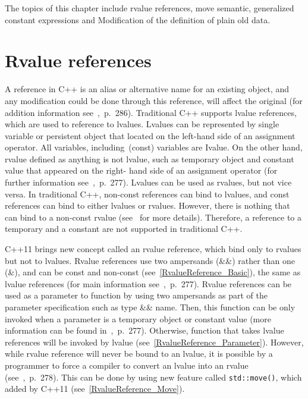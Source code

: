 \documentclass[11pt]{report}
\begin{document}
The topics of this chapter include rvalue references, move semantic, generalized constant expressions and Modification of the definition of plain old data.


\section{Rvalue references}
\label{section: Rvalue references}
A reference in C++ is an alias or alternative name for an existing object, and any modification could be done through this reference, will affect the original (for addition information see~\cite{Gregorie:professionalcpp},~p.~286). Traditional C++ supports lvalue references, which are used to reference to lvalues. Lvalues can be represented by single variable or persistent object that located on the left-hand side of an assignment operator. All variables, including~(const) variables are Ivalue. On the other hand, rvalue defined as anything is not lvalue, such as temporary object and constant value that appeared on the right- hand side of an assignment operator (for further information see~\cite{Gregorie:professionalcpp},~p.~277). Lvalues can be used as rvalues, but not vice versa. In traditional C++, non-const references can bind to lvalues, and const references can bind to either lvalues or rvalues. However, there is nothing that can bind to a non-const rvalue (see~\cite{Stroustrup:2012:Cpp11} for more details). Therefore, a reference to a temporary and a constant are not supported in traditional C++.

C++11 brings new concept called an rvalue reference, which bind only to rvalues but not to lvalues. Rvalue references use two ampersands (\&\&) rather than one (\&), and can be const and non-const (see~\ref{RvalueReference_Basic}), the same as lvalue references  (for main information see~\cite{Gregorie:professionalcpp},~p.~277). Rvalue references can be used as a parameter to function by using two ampersands as part of the parameter specification such as type \&\& name. Then, this function can be only invoked when a parameter is a temporary object or constant value (more information can be found in~\cite{Gregorie:professionalcpp},~p.~277). Otherwise, function that takes lvalue references will be invoked by lvalue (see~\ref{RvalueReference_Parameter}). However, while rvalue reference will never be bound to an lvalue, it is possible by a programmer to force a compiler to convert an lvalue into an rvalue (see~\cite{Gregorie:professionalcpp},~p.~278). This can be done by using new feature called \texttt{std::move()}, which added by C++11 (see~\ref{RvalueReference_Move}).
\end{document}
